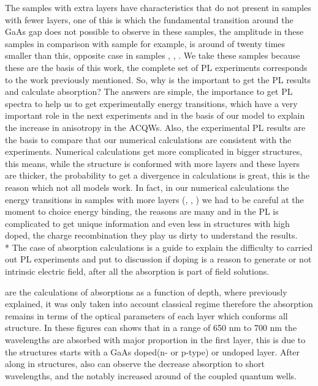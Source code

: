 The samples with extra layers have characteristics that do not present in samples with fewer layers, one of this is which the fundamental transition around the GaAs gap does not possible to observe in these samples, the amplitude in these samples in comparison with sample  for example, is around of twenty times smaller than this, opposite case in samples , , . We take these samples because these are the basis of this work, the complete set of PL experiments corresponds to the work previously mentioned. So, why is the important to get the PL results and calculate absorption?
The answers are simple, the importance to get PL spectra to help us to get experimentally energy transitions, which have a very important role in the next experiments and in the basis of our model to explain the increase in anisotropy in the ACQWs.  Also, the experimental PL results are the basis to compare that our numerical calculations are consistent with the experiments. Numerical calculations get more complicated in bigger structures, this means, while the structure is conformed with more layers and these layers are thicker, the probability to get a divergence in calculations is great, this is the reason which not all models work. In fact, in our numerical calculations the energy transitions in samples with more layers (, , ) we had to be careful at the moment to choice energy binding, the reasons are many and in the PL is complicated to get unique information and even less in structures with high doped, the charge recombination they play us dirty to understand the results. \\*
The case of absorption calculations is a guide to explain the difficulty to carried out PL experiments and put to discussion if doping is a reason to generate or not intrinsic electric field, after all the absorption is part of field solutions. 

 are the calculations of absorptions as a function of depth, where previously explained, it was only taken into account classical regime therefore the absorption remains in terms of the optical parameters of each layer which conforms all structure. In these figures can shows that in a range of 650 nm to 700 nm the wavelengths are absorbed with major proportion in the first layer, this is due to the structures starts with a GaAs doped(n- or p-type) or undoped layer. After along in structures, also can observe the  decrease absorption to short wavelengths, and the notably increased around of the coupled quantum wells.


